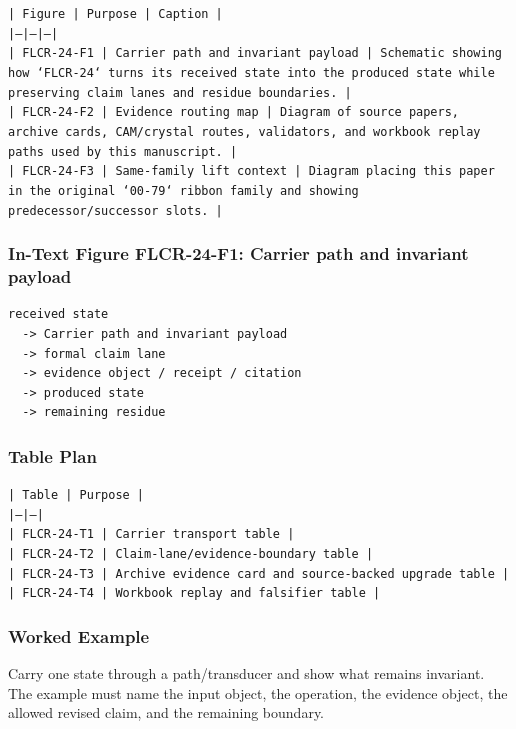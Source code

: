 \documentclass[11pt]{article}
\begin{document}
\noindent\texttt{| Figure | Purpose | Caption |}\\
\noindent\texttt{|---|---|---|}\\
\noindent\texttt{| FLCR-24-F1 | Carrier path and invariant payload | Schematic showing how `FLCR-24` turns its received state into the produced state while preserving claim lanes and residue boundaries. |}\\
\noindent\texttt{| FLCR-24-F2 | Evidence routing map | Diagram of source papers, archive cards, CAM/crystal routes, validators, and workbook replay paths used by this manuscript. |}\\
\noindent\texttt{| FLCR-24-F3 | Same-family lift context | Diagram placing this paper in the original `00-79` ribbon family and showing predecessor/successor slots. |}\\

\subsubsection*{In-Text Figure FLCR-24-F1: Carrier path and invariant payload}

\begin{verbatim}
received state
  -> Carrier path and invariant payload
  -> formal claim lane
  -> evidence object / receipt / citation
  -> produced state
  -> remaining residue
\end{verbatim}

\subsubsection*{Table Plan}

\noindent\texttt{| Table | Purpose |}\\
\noindent\texttt{|---|---|}\\
\noindent\texttt{| FLCR-24-T1 | Carrier transport table |}\\
\noindent\texttt{| FLCR-24-T2 | Claim-lane/evidence-boundary table |}\\
\noindent\texttt{| FLCR-24-T3 | Archive evidence card and source-backed upgrade table |}\\
\noindent\texttt{| FLCR-24-T4 | Workbook replay and falsifier table |}\\

\subsubsection*{Worked Example}

Carry one state through a path/transducer and show what remains invariant. The example must name the input object, the operation,
the evidence object, the allowed revised claim, and the remaining boundary.
\end{document}
